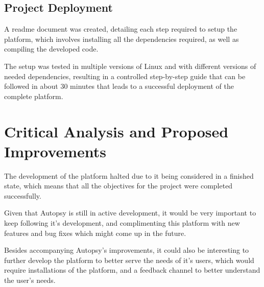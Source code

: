 \subsection{Project Deployment}

A readme document was created, detailing each step required to setup the platform, which involves installing all the dependencies required, as well as compiling the developed code.

The setup was tested in multiple versions of Linux and with different versions of needed dependencies, resulting in a controlled step-by-step guide that can be followed in about 30 minutes that leads to a successful deployment of the complete platform.

\section{Critical Analysis and Proposed Improvements}

The development of the platform halted due to it being considered in a finished state, which means that all the objectives for the project were completed successfully.

Given that Autopsy is still in active development, it would be very important to keep following it's development, and complimenting this platform with new features and bug fixes which might come up in the future.

Besides accompanying Autopsy's improvements, it could also be interesting to further develop the platform to better serve the needs of it's users, which would require installations of the platform, and a feedback channel to better understand the user's needs.
